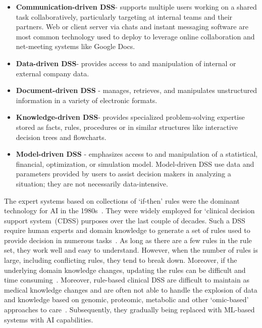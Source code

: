 \vspace{-2mm}
\begin{itemize}[noitemsep]
    \item \textbf{Communication-driven DSS}- supports multiple users working on a shared task collaboratively, particularly targeting at internal teams and their partners. Web or client server via chats and instant messaging software are most common technology used to deploy to leverage online collaboration and net-meeting systems like Google Docs. 
    \item \textbf{Data-driven DSS}- provides access to and manipulation of internal or external company data.
    \item \textbf{Document-driven DSS} - manages, retrieves, and manipulates unstructured information in a variety of electronic formats.
    \item \textbf{Knowledge-driven DSS}- provides specialized problem-solving expertise stored as facts, rules, procedures or in similar structures like interactive decision trees and flowcharts.
    \item \textbf{Model-driven DSS} - emphasizes access to and manipulation of a statistical, financial, optimization, or simulation model. Model-driven DSS use data and parameters provided by users to assist decision makers in analyzing a situation; they are not necessarily data-intensive. 
\end{itemize}
\vspace{-2mm}


\hspace*{3.5mm} The expert systems based on collections of `if-then' rules were the dominant technology for AI in the 1980s~\cite{davenport2019potential}. They were widely employed for `clinical decision support system~(CDSS) purposes over the last couple of decades. Such a DSS require human experts and domain knowledge to generate a set of rules used to provide decision in numerous tasks~\cite{davenport2019potential}. 
As long as there are a few rules in the rule set, they work well and easy to understand. However, when the number of rules is large, including conflicting rules, they tend to break down. Moreover, if the underlying domain knowledge changes, updating the rules can be difficult and time consuming~\cite{davenport2019potential}. Moreover, rule-based clinical DSS are difficult to maintain as medical knowledge changes and are often not able to handle the explosion of data and knowledge based on genomic, proteomic, metabolic and other ‘omic-based’ approaches to care~\cite{das2020opportunities}.
Subsequently, they gradually being replaced with ML-based systems with AI capabilities. 


